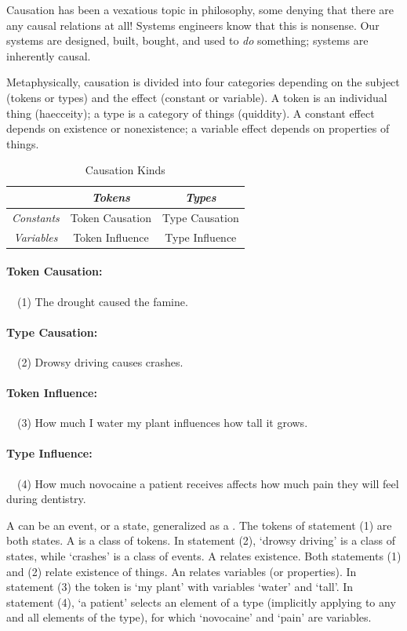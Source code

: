 \pn Causation has been a vexatious topic in philosophy, some denying that there are any causal relations at all! \cite{sep-causation-metaphysics}  
Systems engineers know that this is nonsense.  Our systems are designed, built, bought, and used to \emph{do} something; systems are inherently causal.

\pn Metaphysically, causation is divided into four categories depending on the subject (tokens or types) and the effect (constant or variable).
A token is an individual thing (haecceity); a type is a category of things (quiddity).  A constant effect depends on existence or nonexistence; a variable effect depends on properties of things.

\begin{table}[h]
\caption{Causation Kinds}
\begin{center}
\begin{tabular}{|c|c|c|}
\hline
~ & \emph{Tokens} & \emph{Types} \\ \hline
\emph{Constants} & Token Causation & Type Causation \\ \hline
\emph{Variables} & Token Influence & Type Influence \\ \hline
\end{tabular}
\end{center}
\label{table:causation}
\end{table}%

\paragraph{Token Causation:}~~(1) The drought caused the famine.
\paragraph{Type Causation:}~~(2) Drowsy driving causes crashes.
\paragraph{Token Influence:}~~(3) How much I water my plant influences how tall it grows.
\paragraph{Type Influence:}~~(4) How much novocaine a patient receives affects how much pain they will feel during dentistry.

\pn A  can be an event, or a state, generalized as a .  The tokens of statement (1) are both states.
A  is a class of tokens.  In statement (2), `drowsy driving' is a class of states, while `crashes' is a class of events.
A  relates existence.  Both statements (1) and (2) relate existence of things.
An  relates variables (or properties).  In statement (3) the token is `my plant' with variables `water' and `tall'.
In statement (4), `a patient' selects an element of a type (implicitly applying to any and all elements of the type), for which `novocaine' and `pain' are variables.

